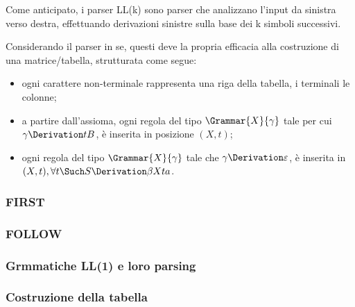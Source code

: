 \documentclass{subfiles}
\begin{document}
Come anticipato, i parser LL(k) sono parser che analizzano l'input da sinistra verso destra,
effettuando derivazioni sinistre sulla base dei k simboli successivi.

Considerando il parser in se, questi deve la propria efficacia alla costruzione di una matrice/tabella, strutturata come segue:
\begin{itemize}
    \item ogni carattere non-terminale rappresenta una riga della tabella, i terminali le colonne;
    \item a partire dall'assioma, ogni regola del tipo \(\Grammar{X}{\gamma}\) tale per cui \(\gamma \Derivation tB\),
          è inserita in posizione \((X, t)\);

    \item ogni regola del tipo \(\Grammar{X}{\gamma}\) tale che \(\gamma \Derivation \varepsilon\),
          è inserita in \((X, t), \forall t \Such S \Derivation \beta X t a\).
\end{itemize}

\subsubsection{FIRST}


\subsubsection{FOLLOW}

\clearpage
\subsubsection{Grmmatiche LL(1) e loro parsing}


\subsubsection{Costruzione della tabella}

\clearpage
\end{document}
